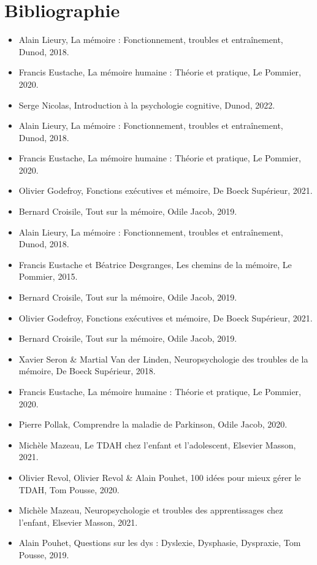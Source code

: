 \documentclass[12pt,a4paper]{report}
\begin{document}
\chapter*{Bibliographie}
\begin{itemize}
    \item Alain Lieury, La mémoire : Fonctionnement, troubles et entraînement, Dunod, 2018.
    \item Francis Eustache, La mémoire humaine : Théorie et pratique, Le Pommier, 2020.
    \item Serge Nicolas, Introduction à la psychologie cognitive, Dunod, 2022.
    
    \item Alain Lieury, La mémoire : Fonctionnement, troubles et entraînement, Dunod, 2018.
    \item Francis Eustache, La mémoire humaine : Théorie et pratique, Le Pommier, 2020.
    \item Olivier Godefroy, Fonctions exécutives et mémoire, De Boeck Supérieur, 2021.
    \item Bernard Croisile, Tout sur la mémoire, Odile Jacob, 2019.
    
    \item Alain Lieury, La mémoire : Fonctionnement, troubles et entraînement, Dunod, 2018.
    \item Francis Eustache et Béatrice Desgranges, Les chemins de la mémoire, Le Pommier, 2015.
    \item Bernard Croisile, Tout sur la mémoire, Odile Jacob, 2019.
    \item Olivier Godefroy, Fonctions exécutives et mémoire, De Boeck Supérieur, 2021.
    
    \item Bernard Croisile, Tout sur la mémoire, Odile Jacob, 2019.
    \item Xavier Seron \& Martial Van der Linden, Neuropsychologie des troubles de la mémoire, De Boeck Supérieur, 2018.
    \item Francis Eustache, La mémoire humaine : Théorie et pratique, Le Pommier, 2020.
    \item Pierre Pollak, Comprendre la maladie de Parkinson, Odile Jacob, 2020.
    
    \item Michèle Mazeau, Le TDAH chez l'enfant et l'adolescent, Elsevier Masson, 2021.
    \item Olivier Revol, Olivier Revol \& Alain Pouhet, 100 idées pour mieux gérer le TDAH, Tom Pousse, 2020.
    \item Michèle Mazeau, Neuropsychologie et troubles des apprentissages chez l'enfant, Elsevier Masson, 2021.
    \item Alain Pouhet, Questions sur les dys : Dyslexie, Dysphasie, Dyspraxie, Tom Pousse, 2019.
    

\end{itemize}
\end{document}
